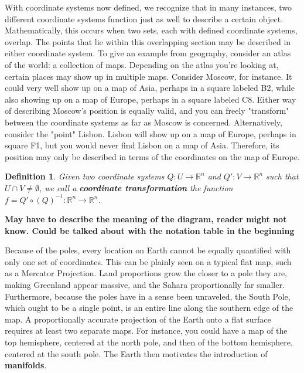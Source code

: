 \documentclass{book}
\newtheorem{defn}[equation]{Definition}
\begin{document}
With coordinate systems now defined, we recognize that in many instances, two different coordinate systems function just as well to describe a certain object. Mathematically, this occurs when two sets, each with defined coordinate systems, overlap. The points that lie within this overlapping section may be described in either coordinate system. To give an example from geography, consider an atlas of the world: a collection of maps. Depending on the atlas you're looking at, certain places may show up in multiple maps. Consider Moscow, for instance. It could very well show up on a map of Asia, perhaps in a square labeled B2, while also showing up on a map of Europe, perhaps in a square labeled C8. Either way of describing Moscow's position is equally valid, and you can freely "transform" between the coordinate systems as far as Moscow is concerned. Alternatively, consider the "point" Lisbon. Lisbon will show up on a map of Europe, perhaps in square F1, but you would never find Lisbon on a map of Asia. Therefore, its position may only be described in terms of the coordinates on the map of Europe.


\begin{defn}
	Given two coordinate systems  $Q : U \to \mathbb{R}^n$ and $Q' : V \to \mathbb{R}^n$ such that $U \cap V \neq \emptyset$, we call a \textbf{coordinate transformation} the function $f = Q' \circ (Q)^{-1} : \mathbb{R}^n \to \mathbb{R}^n$.
\end{defn}



\textbf{May have to describe the meaning of the diagram, reader might not know. Could be talked about with the notation table in the beginning}



Because of the poles, every location on Earth cannot be equally quantified with only one set of coordinates. This can be plainly seen on a typical flat map, such as a Mercator Projection. Land proportions grow the closer to a pole they are, making Greenland appear massive, and the Sahara proportionally far smaller. Furthermore, because the poles have in a sense been unraveled, the South Pole, which ought to be a single point, is an entire line along the southern edge of the map. A proportionally accurate projection of the Earth onto a flat surface requires at least two separate maps. For instance, you could have a map of the top hemisphere, centered at the north pole, and then of the bottom hemisphere, centered at the south pole. The Earth then motivates the introduction of \textbf{manifolds}. 
\end{document}
